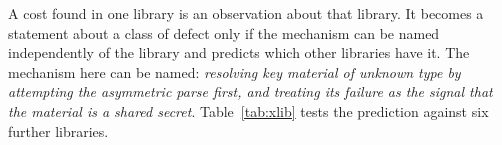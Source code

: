 \documentclass[pdflatex,sn-basic,twocolumn]{sn-jnl}%
\providecommand{\DIFdelbegin}{} %
\newcommand{\DIFscaledelfig}{0.5}
\newlength{\DIFdelgraphicswidth} %
\newlength{\DIFdelgraphicsheight} %
\newcommand{\DIFdelincludegraphics}[2][]{%
\sbox{\DIFdelgraphicsbox}{\DIFOincludegraphics[#1]{#2}}%
\settoboxwidth{\DIFdelgraphicswidth}{\DIFdelgraphicsbox} %
\settoboxtotalheight{\DIFdelgraphicsheight}{\DIFdelgraphicsbox} %
\scalebox{\DIFscaledelfig}{%
\parbox[b]{\DIFdelgraphicswidth}{\usebox{\DIFdelgraphicsbox}\\[-\baselineskip] \rule{\DIFdelgraphicswidth}{0em}}\llap{\resizebox{\DIFdelgraphicswidth}{\DIFdelgraphicsheight}{%
\setlength{\unitlength}{\DIFdelgraphicswidth}%
\begin{picture}(1,1)%
\thicklines\linethickness{2pt} %
{\color[rgb]{1,0,0}\put(0,0){\framebox(1,1){}}}%
{\color[rgb]{1,0,0}\put(0,0){\line( 1,1){1}}}%
{\color[rgb]{1,0,0}\put(0,1){\line(1,-1){1}}}%
\end{picture}%
}\hspace*{3pt}}} %
} %
\DeclareRobustCommand{\DIFdelbegin}{\DIFOdelbegin \let\includegraphics\DIFdelincludegraphics} %
\begin{document}
A cost found in one library is an observation about that library. It becomes a
statement about a class of defect only if the mechanism can be named
independently of the library and predicts which other libraries have it. The
mechanism here can be named: \emph{resolving key material of unknown type by
attempting the asymmetric parse first, and treating its failure as the signal
that the material is a shared secret}. Table~\ref{tab:xlib} tests the
prediction against six further libraries.

\DIFdelbegin %
\end{document}
